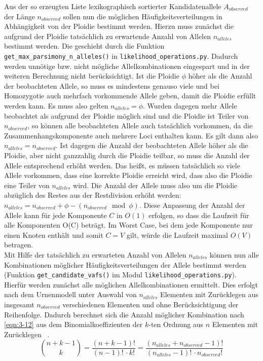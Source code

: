 Aus der so erzeugten Liste lexikographisch sortierter Kandidatenallele $ A_{observed} $ der Länge $ n_{observed} $ sollen nun die möglichen Häufigkeitsverteilungen in Abhängigkeit von der Ploidie bestimmt werden. Hierzu muss zunächst die aufgrund der Ploidie tatsächlich zu erwartende Anzahl von Allelen $n_{alleles}$ bestimmt werden. Die geschieht durch die Funktion \lstinline|get_max_parsimony_n_alleles()| in \lstinline|likelihood_operations.py|. Dadurch werden unnötige bzw. nicht mögliche Allelkombinationen eingespart und in der weiteren Berechnung nicht berücksichtigt. Ist die Ploidie $ \phi $ höher als die Anzahl der beobachteten Allele, so muss es mindestens genauso viele und bei Homozygotie auch mehrfach vorkommende Allele geben, damit die Ploidie erfüllt werden kann. Es muss also gelten $ n_{alleles} = \phi $. Wurden dagegen mehr Allele beobachtet als aufgrund der Ploidie möglich sind und die Ploidie ist Teiler von $n_{observed}$, so können alle beobachteten Allele auch tatsächlich vorkommen, da die Zusammenhangskomponente auch mehrere Loci enthalten kann. Es gilt dann also $ n_{alleles} = n_{observed} $. Ist dagegen die Anzahl der beobachteten Allele höher als die Ploidie, aber nicht ganzzahlig durch die Ploidie teilbar, so muss die Anzahl der Allele entsprechend erhöht werden. Das heißt, es müssen tatsächlich so viele Allele vorkommen, dass eine korrekte Ploidie erreicht wird, dass also die Ploidie eine Teiler von $ n_{alleles} $ wird. Die Anzahl der Allele muss also um die Ploidie abzüglich des Restes aus der Restdivision erhöht werden: $ n_{alleles} = n_{observed} + \phi - (n_{observed} \mod \phi)$. Diese Anpassung der Anzahl der Allele kann für jede Komponente $C$ in $ O(1) $ erfolgen, so dass die Laufzeit für alle Komponenten O(C) beträgt. Im Worst Case, bei dem jede Komponente nur einen Knoten enthält und somit $ C = V $ gilt, würde die Laufzeit maximal $ O(V) $ betragen.\\

Mit Hilfe der tatsächlich zu erwarteten Anzahl von Allelen $ n_{alleles} $ können nun alle Kombinationen möglicher Häufigkeitsverteilungen der Allele bestimmt werden (Funktion \linebreak \lstinline|get_candidate_vafs()| im Modul \lstinline|likelihood_operations.py|). Hierfür werden zunächst alle möglichen Allelkombinationen ermittelt. Dies erfolgt nach dem Urnenmodell unter Auswahl von $ n_{alleles} $ Elementen mit Zurücklegen aus insgesamt $ n_{observed} $ verschiedenen Elementen und ohne Berücksichtigung der Reihenfolge. Dadurch berechnet sich die Anzahl möglicher Kombination nach \eqref{eqn:3-12} aus dem  Binomialkoeffizienten der $k$-ten Ordnung aus $ n $ Elementen mit Zurücklegen ~\cite{tb_stat,bronst}.
\begin{equation} \label{eqn:3-12}
\tag{3-12}
\binom{n + k - 1}{k} = \frac{(n+k-1)!}{(n-1)!\, \cdotp k!} = \frac{(n_{alleles}+n_{observed}-1)!}{(n_{alleles}-1)!\, \cdotp n_{observed}!} 
\end{equation}

